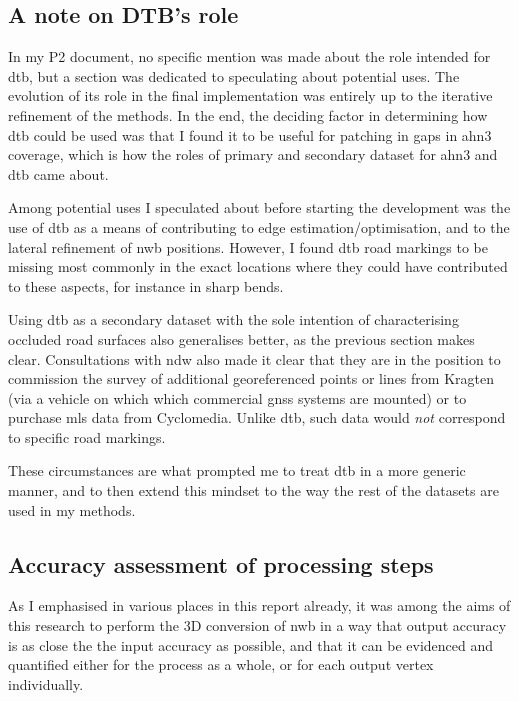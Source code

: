\subsection{A note on DTB's role}
\label{sub:dtbrole}

In my P2 document, no specific mention was made about the role intended for \ac{dtb}, but a section was dedicated to speculating about potential uses. The evolution of its role in the final implementation was entirely up to the iterative refinement of the methods. In the end, the deciding factor in determining how \ac{dtb} could be used was that I found it to be useful for patching in gaps in \ac{ahn3} coverage, which is how the roles of primary and secondary dataset for \ac{ahn3} and \ac{dtb} came about.

Among potential uses I speculated about before starting the development was the use of \ac{dtb} as a means of contributing to edge estimation/optimisation, and to the lateral refinement of \ac{nwb} positions. However, I found \ac{dtb} road markings to be missing most commonly in the exact locations where they could have contributed to these aspects, for instance in sharp bends.

Using \ac{dtb} as a secondary dataset with the sole intention of characterising occluded road surfaces also generalises better, as the previous section makes clear. Consultations with \ac{ndw} also made it clear that they are in the position to commission the survey of additional georeferenced points or lines from Kragten (via a vehicle on which which commercial \ac{gnss} systems are mounted) or to purchase \ac{mls} data from Cyclomedia. Unlike \ac{dtb}, such data would \textit{not} correspond to specific road markings.

These circumstances are what prompted me to treat \ac{dtb} in a more generic manner, and to then extend this mindset to the way the rest of the datasets are used in my methods.

\subsection{Accuracy assessment of processing steps}
\label{sub:accuracyoverview}

As I emphasised in various places in this report already, it was among the aims of this research to perform the 3D conversion of \ac{nwb} in a way that output accuracy is as close the the input accuracy as possible, and that it can be evidenced and quantified either for the process as a whole, or for each output vertex individually.

